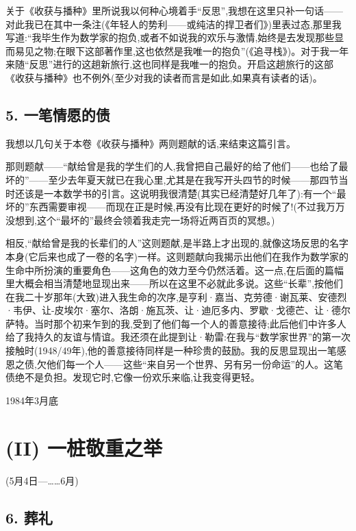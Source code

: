  关于《收获与播种》里所说我以何种心境着手“反思”,我想在这里只补一句话——对此我已在其中一条注(《年轻人的势利——或纯洁的捍卫者们》)里表过态,那里我写道:“我毕生作为数学家的抱负,或者不如说我的欢乐与激情,始终是去发现那些显而易见之物;在眼下这部著作里,这也依然是我唯一的抱负”(《追寻栈》)。对于我一年来随“反思”进行的这趟新旅行,这也同样是我唯一的抱负。开启这趟旅行的这部《收获与播种》也不例外(至少对我的读者而言是如此,如果真有读者的话)。

\subsection{5. 一笔情愿的债}

我想以几句关于本卷《收获与播种》两则题献的话,来结束这篇引言。

那则题献——“献给曾是我的学生们的人,我曾把自己最好的给了他们——也给了最坏的”——至少去年夏天就已在我心里,尤其是在我写开头四节的时候——那四节当时还该是一本数学书的引言。这说明我很清楚(其实已经清楚好几年了):有一个“最坏的”东西需要审视——而现在正是时候,再没有比现在更好的时候了!(不过我万万没想到,这个“最坏的”最终会领着我走完一场将近两百页的冥想。)

相反,“献给曾是我的长辈们的人”这则题献,是半路上才出现的,就像这场反思的名字本身(它后来也成了一卷的名字)一样。这则题献向我揭示出他们在我作为数学家的生命中所扮演的重要角色——这角色的效力至今仍然活着。这一点,在后面的篇幅里大概会相当清楚地显现出来——所以在这里不必就此多说。这些“长辈”,按他们在我二十岁那年(大致)进入我生命的次序,是亨利·嘉当、克劳德·谢瓦莱、安德烈·韦伊、让-皮埃尔·塞尔、洛朗·施瓦茨、让·迪厄多内、罗歇·戈德芒、让·德尔萨特。当时那个初来乍到的我,受到了他们每一个人的善意接待;此后他们中许多人给了我持久的友谊与情谊。我还须在此提到让·勒雷:在我与“数学家世界”的第一次接触时(1948/49年),他的善意接待同样是一种珍贵的鼓励。我的反思显现出一笔感恩之债,欠他们每一个人——这些“来自另一个世界、另有另一份命运”的人。这笔债绝不是负担。发现它时,它像一份欢乐来临,让我变得更轻。

\noindent 1984年3月底\par

\section{(II) 一桩敬重之举}

(5月4日—……6月)

\subsection{6. 葬礼}

